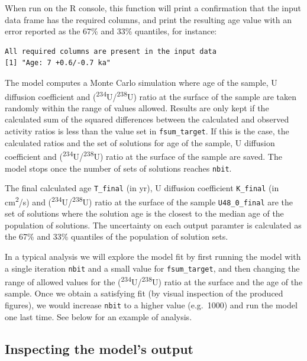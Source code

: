 \documentclass[]{elsarticle} %
\begin{document}
When run on the R console, this function will print a confirmation that the input data frame has the required columns, and print the resulting age value with an error reported as the 67\% and 33\% quantiles, for instance:

\begin{verbatim}
All required columns are present in the input data
[1] "Age: 7 +0.6/-0.7 ka"
\end{verbatim}

The model computes a Monte Carlo simulation where age of the sample, U diffusion coefficient and (\textsuperscript{234}U/\textsuperscript{238}U) ratio at the surface of the sample are taken randomly within the range of values allowed. Results are only kept if the calculated sum of the squared differences between the calculated and observed activity ratios is less than the value set in \texttt{fsum\_target}. If this is the case, the calculated ratios and the set of solutions for age of the sample, U diffusion coefficient and (\textsuperscript{234}U/\textsuperscript{238}U) ratio at the surface of the sample are saved. The model stops once the number of sets of solutions reaches \texttt{nbit}.

The final calculated age \texttt{T\_final} (in yr), U diffusion coefficient \texttt{K\_final} (in cm\textsuperscript{2}/s) and (\textsuperscript{234}U/\textsuperscript{238}U) ratio at the surface of the sample \texttt{U48\_0\_final} are the set of solutions where the solution age is the closest to the median age of the population of solutions. The uncertainty on each output paramter is calculated as the 67\% and 33\% quantiles of the population of solution sets.

In a typical analysis we will explore the model fit by first running the model with a single iteration \texttt{nbit} and a small value for \texttt{fsum\_target}, and then changing the range of allowed values for the (\textsuperscript{234}U/\textsuperscript{238}U) ratio at the surface and the age of the sample. Once we obtain a satisfying fit (by visual inspection of the produced figures), we would increase \texttt{nbit} to a higher value (e.g.~1000) and run the model one last time. See below for an example of analysis.

\newpage

\hypertarget{inspecting-the-models-output}{%
\subsection{Inspecting the model's output}\label{inspecting-the-models-output}}
\end{document}
